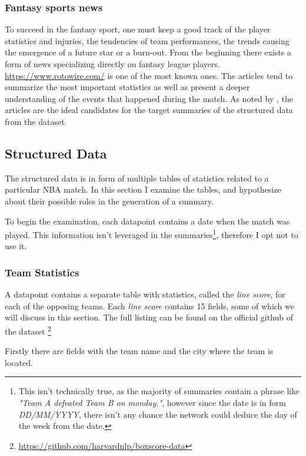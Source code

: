 \subsubsection{Fantasy sports news}

To succeed in the fantasy sport, one must keep a good track of the player statistics and injuries, the tendencies of team performances, the trends causing the emergence of a future star or a burn-out. From the beginning there exists a form of news specializing directly on fantasy league players. \url{https://www.rotowire.com/} is one of the most known ones. The articles tend to summarize the most important statistics as well as present a deeper understanding of the events that happened during the match. As noted by \citep{wiseman2017}, the articles are the ideal candidates for the target summaries of the structured data from the dataset.

\subsection{Structured Data} \label{structured_data_rotowire}

The structured data is in form of multiple tables of statistics related to a particular NBA match. In this section I examine the tables, and hypothesize about their possible roles in the generation of a summary.

To begin the examination, each datapoint contains a date when the match was played. This information isn't leveraged in the summaries\footnote{This isn't technically true, as the majority of summaries contain a phrase like \emph{"Team A defeated Team B on monday."}, however since the date is in form \emph{DD/MM/YYYY}, there isn't any chance the network could deduce the day of the week from the date.}, therefore I opt not to use it.

\subsubsection{Team Statistics}

A datapoint contains a separate table with statistics, called the \emph{line score}, for each of the opposing teams. Each \emph{line score} contains 15 fields, some of which we will discuss in this section. The full listing can be found on the official github of the dataset \footnote{\label{note1}\url{https://github.com/harvardnlp/boxscore-data}}

Firstly there are fields with the team name and the city where the team is located.

